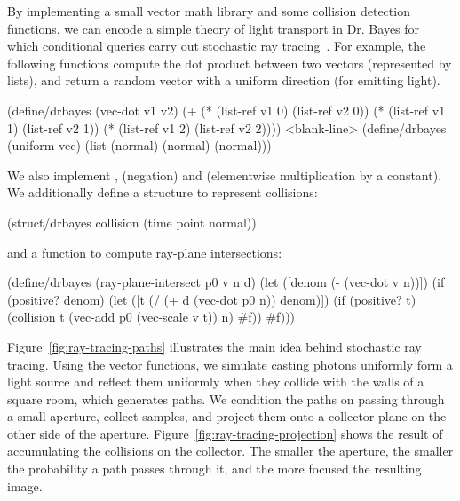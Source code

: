 By implementing a small vector math library and some collision detection functions, we can encode a simple theory of light transport in Dr. Bayes for which conditional queries carry out stochastic ray tracing~\cite{cit:veach-1997siggraph-mlt}.
For example, the following functions compute the dot product between two vectors (represented by lists), and return a random vector with a uniform direction (for emitting light).
\begin{center}\singlespacing
\begin{schemedisplay}
(define/drbayes (vec-dot v1 v2)
  (+ (* (list-ref v1 0) (list-ref v2 0))
     (* (list-ref v1 1) (list-ref v2 1))
     (* (list-ref v1 2) (list-ref v2 2))))
<blank-line>
(define/drbayes (uniform-vec)
  (list (normal) (normal) (normal)))
\end{schemedisplay}
\end{center}
We also implement ,  (negation) and  (elementwise multiplication by a constant).
We additionally define a structure to represent collisions:
\begin{center}\singlespacing
\begin{schemedisplay}
(struct/drbayes collision (time point normal))
\end{schemedisplay}
\end{center}
and a function to compute ray-plane intersections:
\begin{center}\singlespacing
\begin{schemedisplay}
(define/drbayes (ray-plane-intersect p0 v n d)
  (let ([denom  (- (vec-dot v n))])
    (if (positive? denom)
        (let ([t  (/ (+ d (vec-dot p0 n)) denom)])
          (if (positive? t) (collision t (vec-add p0 (vec-scale v t)) n) #f))
        #f)))
\end{schemedisplay}
\end{center}

Figure~\ref{fig:ray-tracing-paths} illustrates the main idea behind stochastic ray tracing.
Using the vector functions, we simulate casting photons uniformly form a light source and reflect them uniformly when they collide with the walls of a square room, which generates paths.
We condition the paths on passing through a small aperture, collect samples, and project them onto a collector plane on the other side of the aperture.
Figure~\ref{fig:ray-tracing-projection} shows the result of accumulating the collisions on the collector.
The smaller the aperture, the smaller the probability a path passes through it, and the more focused the resulting image.

